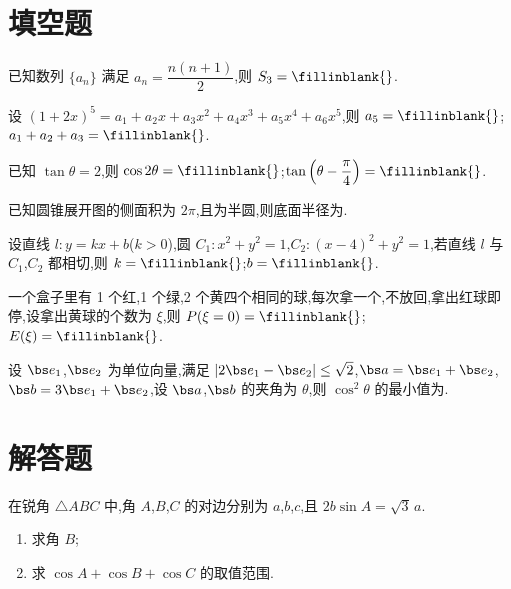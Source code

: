 \section{填空题}

\begin{problem}
已知数列 \(\{a_n\}\) 满足 \(a_n=\dfrac{n(n+1)}{2}\),则 \(S_3=\fillinblank{}\).
\end{problem}

\begin{problem}
设 \((1+2x)^5=a_1+a_2x+a_3x^2+a_4x^3+a_5x^4+a_6x^5\),则 \(a_5=\fillinblank{}\);\(a_1+a_2+a_3=\fillinblank{}\).
\end{problem}

\begin{problem}
已知 \(\tan\theta=2\),则 \(\cos2\theta=\fillinblank{}\);\(\tan\left(\theta-\dfrac{\pi}{4}\right)=\fillinblank{}\).
\end{problem}

\begin{problem}
已知圆锥展开图的侧面积为 \(2\pi\),且为半圆,则底面半径为\fillinblank{}.
\end{problem}

\begin{problem}
设直线 \(l:y=kx+b\)(\(k>0\)),圆 \(C_1:x^2+y^2=1\),\(C_2:(x-4)^2+y^2=1\),若直线 \(l\) 与 \(C_1\),\(C_2\) 都相切,则 \(k=\fillinblank{}\);\(b=\fillinblank{}\).
\end{problem}

\begin{problem}
一个盒子里有 1 个红,1 个绿,2 个黄四个相同的球,每次拿一个,不放回,拿出红球即停,设拿出黄球的个数为 \(\xi\),则 \(P(\xi=0)=\fillinblank{}\);\(E(\xi)=\fillinblank{}\).
\end{problem}

\begin{problem}
设 \(\bs e_1\),\(\bs e_2\) 为单位向量,满足 \(|2\bs e_1-\bs e_2|\le\sqrt2\),\(\bs a=\bs e_1+\bs e_2\),\(\bs b=3\bs e_1+\bs e_2\),设 \(\bs a\),\(\bs b\) 的夹角为 \(\theta\),则 \(\cos^2\theta\) 的最小值为\fillinblank{}.
\end{problem}

\section{解答题}

\begin{problem}
在锐角 \(\triangle ABC\) 中,角 \(A\),\(B\),\(C\) 的对边分别为 \(a\),\(b\),\(c\),且 \(2b\sin A=\sqrt3\,a\).

\begin{enumerate}
\item 求角 \(B\);

\item 求 \(\cos A+\cos B+\cos C\) 的取值范围.
\end{enumerate}
\end{problem}

